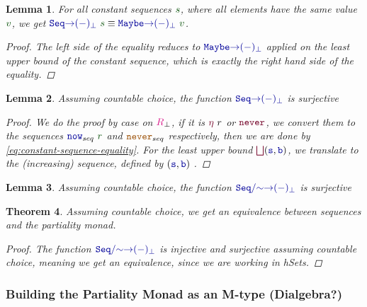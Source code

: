 \documentclass[twoside,11pt,openright]{report}
\theoremstyle{plain} %
\newtheorem{thm}{Theorem}[section]
\newtheorem{lem}[thm]{Lemma}
\theoremstyle{definition}
\theoremstyle{remark}
\newcommand*{\term}[1]{\textcolor{green!30!black}{#1}} %
\newcommand*{\type}[1]{\textcolor{magenta!90!black}{#1}}
\newcommand*{\constant}[1]{\textcolor{orange!60!black}{\ensuremath{\mathtt{#1}}}}
\newcommand*{\function}[1]{\textcolor{blue!60!black}{\ensuremath{\mathtt{#1}}}}
\newcommand*{\constructor}[1]{\textcolor{purple!60!black}{\ensuremath{\mathtt{#1}}}}
\begin{document}
\begin{lem}
  \label{eq:constant-sequence-equality}
  For all constant sequences \(\term{s}\), where all elements have the same value \(\term{v}\), we get \(\function{Seq{\rightarrow}(-)_\bot}~\term{s} \equiv \function{Maybe{\rightarrow}(-)_\bot}~\term{v}\).
  \begin{proof}
    The left side of the equality reduces to \(\function{Maybe{\rightarrow}(-)_\bot}\) applied on the least upper bound of the constant sequence, which is exactly the right hand side of the equality.
  \end{proof}
\end{lem}
\begin{lem}
  Assuming countable choice, the function \(\function{Seq{\rightarrow}(-)_\bot}\) is surjective
  \begin{proof}
    We do the proof by case  on \(\type{R}_{\bot}\), if it is \(\constructor{\eta}~r\) or \(\constructor{never}\), we convert them to the sequences \(\function{now}_{seq}~\term{r}\) and \(\constant{never}_{seq}\) respectively, then we are done by \eqref{eq:constant-sequence-equality}. For the least upper bound \(\constructor{\bigsqcup} (\function{s},\function{b})\), we translate to the (increasing) sequence, defined by \((\function{s},\function{b})\) . 
  \end{proof}
\end{lem}
\begin{lem}
  Assuming countable choice, the function \(\function{Seq/{\sim}{\rightarrow}(-)_\bot}\) is surjective
  
\end{lem}
\begin{thm}
  Assuming countable choice, we get an equivalence between sequences and the partiality monad.
  \begin{proof}
 The function \(\function{Seq/{\sim}{\rightarrow}(-)_\bot}\) is injective and surjective assuming countable choice, meaning we get an equivalence, since we are working in hSets.
\end{proof}
\end{thm}

\subsubsection{Building the Partiality Monad as an M-type (Dialgebra?)}
\end{document}
